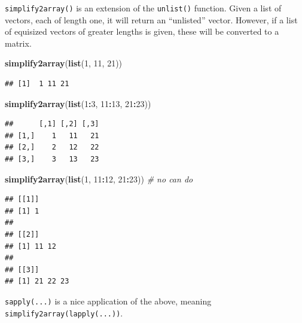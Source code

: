 \documentclass[10pt,b5paper,krantz1]{krantz}
\newenvironment{Shaded}{\begin{snugshade}}{\end{snugshade}}
\newcommand{\CommentTok}[1]{\textcolor[rgb]{0.37,0.37,0.37}{\textit{#1}}}
\newcommand{\DecValTok}[1]{\textcolor[rgb]{0.06,0.06,0.06}{#1}}
\newcommand{\KeywordTok}[1]{\textcolor[rgb]{0.27,0.27,0.27}{\textbf{#1}}}
\newcommand{\NormalTok}[1]{#1}
\newcommand{\OperatorTok}[1]{\textcolor[rgb]{0.43,0.43,0.43}{\textbf{#1}}}
\begin{document}
\texttt{simplify2array()} is an extension of the \texttt{unlist()} function.
Given a list of vectors, each of length one, it will return an ``unlisted'' vector.
However, if a list of equisized vectors of greater lengths is given,
these will be converted to a matrix.

\begin{Shaded}
\begin{Highlighting}[]
\KeywordTok{simplify2array}\NormalTok{(}\KeywordTok{list}\NormalTok{(}\DecValTok{1}\NormalTok{, }\DecValTok{11}\NormalTok{, }\DecValTok{21}\NormalTok{))}
\end{Highlighting}
\end{Shaded}

\begin{verbatim}
## [1]  1 11 21
\end{verbatim}

\begin{Shaded}
\begin{Highlighting}[]
\KeywordTok{simplify2array}\NormalTok{(}\KeywordTok{list}\NormalTok{(}\DecValTok{1}\OperatorTok{:}\DecValTok{3}\NormalTok{, }\DecValTok{11}\OperatorTok{:}\DecValTok{13}\NormalTok{, }\DecValTok{21}\OperatorTok{:}\DecValTok{23}\NormalTok{))}
\end{Highlighting}
\end{Shaded}

\begin{verbatim}
##      [,1] [,2] [,3]
## [1,]    1   11   21
## [2,]    2   12   22
## [3,]    3   13   23
\end{verbatim}

\begin{Shaded}
\begin{Highlighting}[]
\KeywordTok{simplify2array}\NormalTok{(}\KeywordTok{list}\NormalTok{(}\DecValTok{1}\NormalTok{, }\DecValTok{11}\OperatorTok{:}\DecValTok{12}\NormalTok{, }\DecValTok{21}\OperatorTok{:}\DecValTok{23}\NormalTok{)) }\CommentTok{# no can do}
\end{Highlighting}
\end{Shaded}

\begin{verbatim}
## [[1]]
## [1] 1
## 
## [[2]]
## [1] 11 12
## 
## [[3]]
## [1] 21 22 23
\end{verbatim}

\texttt{sapply(...)} is a nice application of the above, meaning \texttt{simplify2array(lapply(...))}.

\begin{Shaded}
\end{Shaded}
\end{document}
